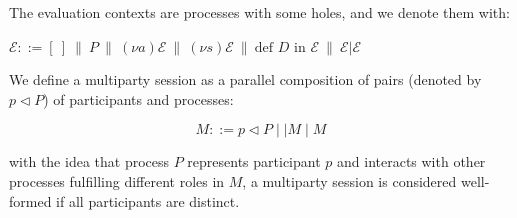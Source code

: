 The evaluation contexts are processes with some holes, and we denote them with:
\begin{center}
    $\mathcal{E} ::= [\ ]\  \|\  P\ \| \  (\nu a)\mathcal{E}\ \|\ (\nu s)\mathcal{E}\ \|\ \text{def } D \text{ in } \mathcal{E}\ \|\ \mathcal{E} | \mathcal{E}$
\end{center}

We define a multiparty session as a parallel composition of pairs (denoted by
$p \triangleleft P$) of participants and processes:

\begin{equation}
 M ::= p \triangleleft P \mid\mid M \mid M
\end{equation}

with the idea that process $P$ represents participant $p$ and interacts with other
processes fulfilling different roles in $M$, a multiparty session is considered
well-formed if all participants are distinct.



